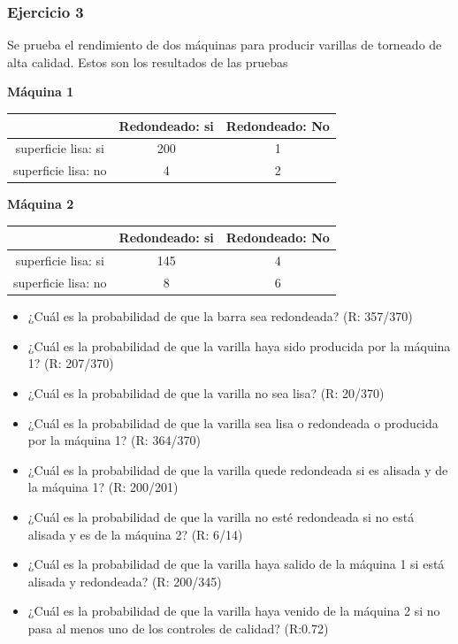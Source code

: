 \documentclass[
]{book}
\providecommand{\tightlist}{%
  \setlength{\itemsep}{0pt}\setlength{\parskip}{0pt}}
\begin{document}
\hypertarget{ejercicio-3-1}{%
\subsubsection{Ejercicio 3}\label{ejercicio-3-1}}

Se prueba el rendimiento de dos máquinas para producir varillas de torneado de alta calidad. Estos son los resultados de las pruebas

\textbf{Máquina 1}

\begin{longtable}[]{@{}ccc@{}}
\toprule\noalign{}
& Redondeado: si & Redondeado: No \\
\midrule\noalign{}
\endhead
\bottomrule\noalign{}
\endlastfoot
superficie lisa: si & 200 & 1 \\
superficie lisa: no & 4 & 2 \\
\end{longtable}

\textbf{Máquina 2}

\begin{longtable}[]{@{}ccc@{}}
\toprule\noalign{}
& Redondeado: si & Redondeado: No \\
\midrule\noalign{}
\endhead
\bottomrule\noalign{}
\endlastfoot
superficie lisa: si & 145 & 4 \\
superficie lisa: no & 8 & 6 \\
\end{longtable}

\begin{itemize}
\tightlist
\item
  ¿Cuál es la probabilidad de que la barra sea redondeada? (R: 357/370)
\item
  ¿Cuál es la probabilidad de que la varilla haya sido producida por la máquina 1? (R: 207/370)
\item
  ¿Cuál es la probabilidad de que la varilla no sea lisa? (R: 20/370)
\item
  ¿Cuál es la probabilidad de que la varilla sea lisa o redondeada o producida por la máquina 1? (R: 364/370)
\item
  ¿Cuál es la probabilidad de que la varilla quede redondeada si es alisada y de la máquina 1? (R: 200/201)
\item
  ¿Cuál es la probabilidad de que la varilla no esté redondeada si no está alisada y es de la máquina 2? (R: 6/14)
\item
  ¿Cuál es la probabilidad de que la varilla haya salido de la máquina 1 si está alisada y redondeada? (R: 200/345)
\item
  ¿Cuál es la probabilidad de que la varilla haya venido de la máquina 2 si no pasa al menos uno de los controles de calidad? (R:0.72)
\end{itemize}
\end{document}
